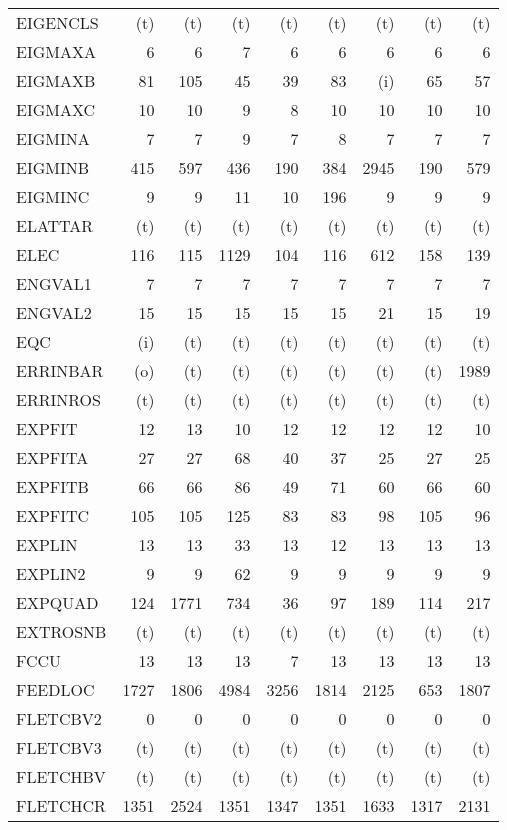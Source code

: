 \documentclass[11pt,twoside]{article}
\begin{document}
{\begin{longtable}[c]{|l|r|r|r|r|r|r|r|r|}
 EIGENCLS & (t) & (t) & (t) & (t) & (t) & (t) & (t) & (t) \\
 EIGMAXA & 6 & 6 & 7 & 6 & 6 & 6 & 6 & 6 \\
 EIGMAXB & 81 & 105 & 45 & 39 & 83 & (i) & 65 & 57 \\
 EIGMAXC & 10 & 10 & 9 & 8 & 10 & 10 & 10 & 10 \\
 EIGMINA & 7 & 7 & 9 & 7 & 8 & 7 & 7 & 7 \\
 EIGMINB & 415 & 597 & 436 & 190 & 384 & 2945 & 190 & 579 \\
 EIGMINC & 9 & 9 & 11 & 10 & 196 & 9 & 9 & 9 \\
 ELATTAR & (t) & (t) & (t) & (t) & (t) & (t) & (t) & (t) \\
 ELEC & 116 & 115 & 1129 & 104 & 116 & 612 & 158 & 139 \\
 ENGVAL1 & 7 & 7 & 7 & 7 & 7 & 7 & 7 & 7 \\
 ENGVAL2 & 15 & 15 & 15 & 15 & 15 & 21 & 15 & 19 \\
 EQC & (i) & (t) & (t) & (t) & (t) & (t) & (t) & (t) \\
 ERRINBAR & (o) & (t) & (t) & (t) & (t) & (t) & (t) & 1989 \\
 ERRINROS & (t) & (t) & (t) & (t) & (t) & (t) & (t) & (t) \\
 EXPFIT & 12 & 13 & 10 & 12 & 12 & 12 & 12 & 10 \\
 EXPFITA & 27 & 27 & 68 & 40 & 37 & 25 & 27 & 25 \\
 EXPFITB & 66 & 66 & 86 & 49 & 71 & 60 & 66 & 60 \\
 EXPFITC & 105 & 105 & 125 & 83 & 83 & 98 & 105 & 96 \\
 EXPLIN & 13 & 13 & 33 & 13 & 12 & 13 & 13 & 13 \\
 EXPLIN2 & 9 & 9 & 62 & 9 & 9 & 9 & 9 & 9 \\
 EXPQUAD & 124 & 1771 & 734 & 36 & 97 & 189 & 114 & 217 \\
 EXTROSNB & (t) & (t) & (t) & (t) & (t) & (t) & (t) & (t) \\
 FCCU & 13 & 13 & 13 & 7 & 13 & 13 & 13 & 13 \\
 FEEDLOC & 1727 & 1806 & 4984 & 3256 & 1814 & 2125 & 653 & 1807 \\
 FLETCBV2 & 0 & 0 & 0 & 0 & 0 & 0 & 0 & 0 \\
 FLETCBV3 & (t) & (t) & (t) & (t) & (t) & (t) & (t) & (t) \\
 FLETCHBV & (t) & (t) & (t) & (t) & (t) & (t) & (t) & (t) \\
 FLETCHCR & 1351 & 2524 & 1351 & 1347 & 1351 & 1633 & 1317 & 2131 \\

\end{longtable}}
\end{document}
